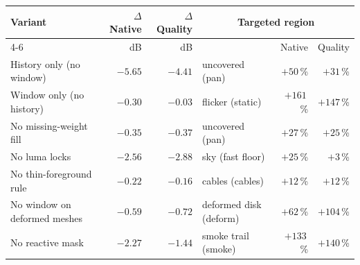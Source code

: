 \begin{tabular}{lrrlrr}
\toprule
Variant & $\Delta$ Native & $\Delta$ Quality & \multicolumn{3}{c}{Targeted region} \\
\cmidrule(lr){4-6}
 & dB & dB & & Native & Quality \\
\midrule
History only (no window) & $-5.65$ & $-4.41$ & uncovered (pan) & $+50$\,\% & $+31$\,\% \\
Window only (no history) & $-0.30$ & $-0.03$ & flicker (static) & $+161$\,\% & $+147$\,\% \\
No missing-weight fill & $-0.35$ & $-0.37$ & uncovered (pan) & $+27$\,\% & $+25$\,\% \\
No luma locks & $-2.56$ & $-2.88$ & sky (fast floor) & $+25$\,\% & $+3$\,\% \\
No thin-foreground rule & $-0.22$ & $-0.16$ & cables (cables) & $+12$\,\% & $+12$\,\% \\
No window on deformed meshes & $-0.59$ & $-0.72$ & deformed disk (deform) & $+62$\,\% & $+104$\,\% \\
No reactive mask & $-2.27$ & $-1.44$ & smoke trail (smoke) & $+133$\,\% & $+140$\,\% \\
\bottomrule
\end{tabular}

